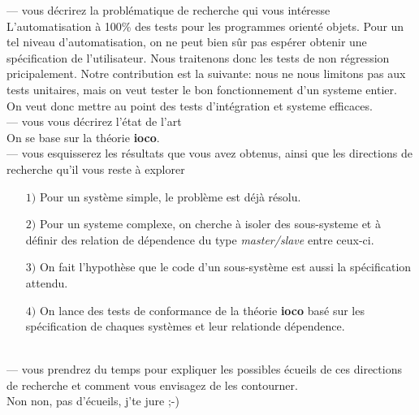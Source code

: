 \documentclass[a4paper]{report}
\begin{document}
--- vous décrirez la problématique de recherche qui vous intéresse\\
\newline
L'automatisation à 100\% des tests pour les programmes orienté objets. Pour un tel niveau d'automatisation, on ne peut bien sûr pas espérer obtenir une spécification de l'utilisateur. Nous traitenons donc les tests de non régression pricipalement. Notre contribution est la suivante: nous ne nous limitons pas aux tests unitaires, mais on veut tester le bon fonctionnement d'un systeme entier. On veut donc mettre au point des tests d'intégration et systeme efficaces.\\
\newline
\newline
--- vous vous décrirez l'état de l'art\\
\newline
On se base sur la théorie \textbf{ioco}.\\
\newline
\newline
--- vous esquisserez les résultats que vous avez obtenus, ainsi que  les directions de recherche qu'il vous reste à explorer\\
\newline
\begin{itemize}
\item[$ 1) $] Pour un système simple, le problème est déjà résolu.
\item[$ 2) $] Pour un systeme complexe, on cherche à isoler des sous-systeme et à définir des relation de dépendence du type \textit{master/slave} entre ceux-ci.
\item[$ 3) $] On fait l'hypothèse que le code d'un sous-système est aussi la spécification attendu.
\item[$ 4) $] On lance des tests de conformance de la théorie \textbf{ioco} basé sur les spécification de chaques systèmes et leur relationde dépendence.
\end{itemize}
$ $\\
\newline
\newline
--- vous prendrez du temps pour expliquer les possibles écueils de ces directions de recherche et comment vous envisagez de les contourner.\\
\newline
Non non, pas d'écueils, j'te jure ;-)\\


\end{document}
